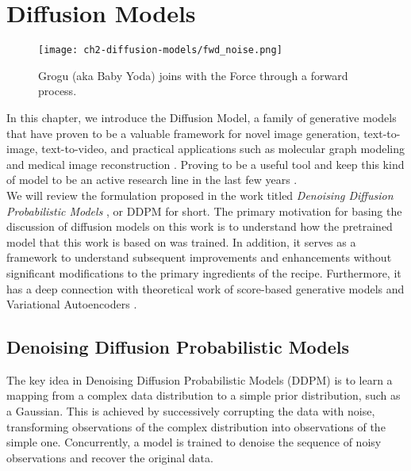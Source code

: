 \chapter{Diffusion Models}

\begin{figure}[ht]
    \centering
    \texttt{[image: ch2-diffusion-models/fwd\_noise.png]}
    \captionsetup{width=\textwidth} %
    \caption{Grogu (aka Baby Yoda) joins with the Force through a forward process.}
    \label{fig:fwd-process-grogu}
\end{figure}
  
In this chapter, we introduce the Diffusion Model, a family of generative models that have proven to be a valuable framework for novel image generation, text-to-image, text-to-video, and practical applications such as molecular graph modeling and medical image reconstruction \citep{sohldickstein2015deep, ramesh2021zeroshot,rombach2022highresolution,ho2020denoising,singer2022makeavideo,jing2023torsional,song2020denoising}. Proving to be a useful tool and keep this kind of model to be an active research line in the last few years \citep{yang2024diffusion}. \\

\noindent We will review the formulation proposed in the work titled \textit{Denoising Diffusion Probabilistic Models} \cite{ho2020denoising}, or DDPM for short. The primary motivation for basing the discussion of diffusion models on this work is to understand how the pretrained model that this work is based on was trained. In addition, it serves as a framework to understand subsequent improvements and enhancements without significant modifications to the primary ingredients of the recipe. Furthermore, it has a deep connection with theoretical work of score-based generative models \citep{song2020generative} \citep{song2020improved} \citep{song2021scorebased} and Variational Autoencoders \citep{luo2022understanding}.

\section{Denoising Diffusion Probabilistic Models}

The key idea in Denoising Diffusion Probabilistic Models (DDPM) is to learn a mapping from a complex data distribution to a simple prior distribution, such as a Gaussian. This is achieved by successively corrupting the data with noise, transforming observations of the complex distribution into observations of the simple one. Concurrently, a model is trained to denoise the sequence of noisy observations and recover the original data.\\

